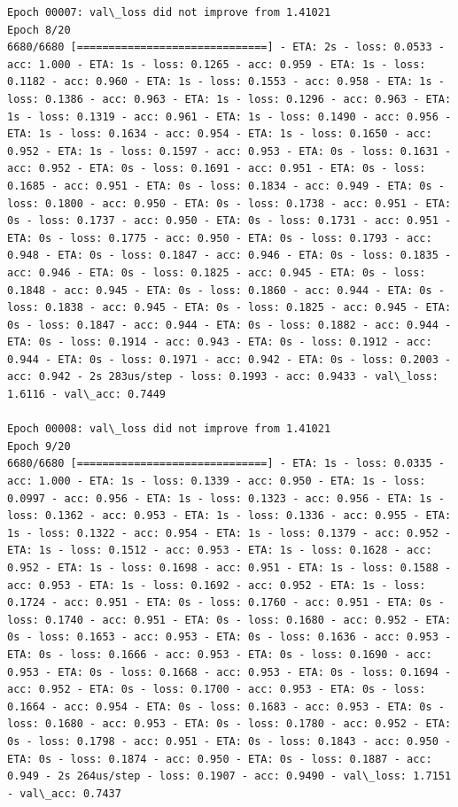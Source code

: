 \documentclass[11pt]{article}
\begin{document}
\begin{Verbatim}[commandchars=\\\{\}]
Epoch 00007: val\_loss did not improve from 1.41021
Epoch 8/20
6680/6680 [==============================] - ETA: 2s - loss: 0.0533 - acc: 1.000 - ETA: 1s - loss: 0.1265 - acc: 0.959 - ETA: 1s - loss: 0.1182 - acc: 0.960 - ETA: 1s - loss: 0.1553 - acc: 0.958 - ETA: 1s - loss: 0.1386 - acc: 0.963 - ETA: 1s - loss: 0.1296 - acc: 0.963 - ETA: 1s - loss: 0.1319 - acc: 0.961 - ETA: 1s - loss: 0.1490 - acc: 0.956 - ETA: 1s - loss: 0.1634 - acc: 0.954 - ETA: 1s - loss: 0.1650 - acc: 0.952 - ETA: 1s - loss: 0.1597 - acc: 0.953 - ETA: 0s - loss: 0.1631 - acc: 0.952 - ETA: 0s - loss: 0.1691 - acc: 0.951 - ETA: 0s - loss: 0.1685 - acc: 0.951 - ETA: 0s - loss: 0.1834 - acc: 0.949 - ETA: 0s - loss: 0.1800 - acc: 0.950 - ETA: 0s - loss: 0.1738 - acc: 0.951 - ETA: 0s - loss: 0.1737 - acc: 0.950 - ETA: 0s - loss: 0.1731 - acc: 0.951 - ETA: 0s - loss: 0.1775 - acc: 0.950 - ETA: 0s - loss: 0.1793 - acc: 0.948 - ETA: 0s - loss: 0.1847 - acc: 0.946 - ETA: 0s - loss: 0.1835 - acc: 0.946 - ETA: 0s - loss: 0.1825 - acc: 0.945 - ETA: 0s - loss: 0.1848 - acc: 0.945 - ETA: 0s - loss: 0.1860 - acc: 0.944 - ETA: 0s - loss: 0.1838 - acc: 0.945 - ETA: 0s - loss: 0.1825 - acc: 0.945 - ETA: 0s - loss: 0.1847 - acc: 0.944 - ETA: 0s - loss: 0.1882 - acc: 0.944 - ETA: 0s - loss: 0.1914 - acc: 0.943 - ETA: 0s - loss: 0.1912 - acc: 0.944 - ETA: 0s - loss: 0.1971 - acc: 0.942 - ETA: 0s - loss: 0.2003 - acc: 0.942 - 2s 283us/step - loss: 0.1993 - acc: 0.9433 - val\_loss: 1.6116 - val\_acc: 0.7449

Epoch 00008: val\_loss did not improve from 1.41021
Epoch 9/20
6680/6680 [==============================] - ETA: 1s - loss: 0.0335 - acc: 1.000 - ETA: 1s - loss: 0.1339 - acc: 0.950 - ETA: 1s - loss: 0.0997 - acc: 0.956 - ETA: 1s - loss: 0.1323 - acc: 0.956 - ETA: 1s - loss: 0.1362 - acc: 0.953 - ETA: 1s - loss: 0.1336 - acc: 0.955 - ETA: 1s - loss: 0.1322 - acc: 0.954 - ETA: 1s - loss: 0.1379 - acc: 0.952 - ETA: 1s - loss: 0.1512 - acc: 0.953 - ETA: 1s - loss: 0.1628 - acc: 0.952 - ETA: 1s - loss: 0.1698 - acc: 0.951 - ETA: 1s - loss: 0.1588 - acc: 0.953 - ETA: 1s - loss: 0.1692 - acc: 0.952 - ETA: 1s - loss: 0.1724 - acc: 0.951 - ETA: 0s - loss: 0.1760 - acc: 0.951 - ETA: 0s - loss: 0.1740 - acc: 0.951 - ETA: 0s - loss: 0.1680 - acc: 0.952 - ETA: 0s - loss: 0.1653 - acc: 0.953 - ETA: 0s - loss: 0.1636 - acc: 0.953 - ETA: 0s - loss: 0.1666 - acc: 0.953 - ETA: 0s - loss: 0.1690 - acc: 0.953 - ETA: 0s - loss: 0.1668 - acc: 0.953 - ETA: 0s - loss: 0.1694 - acc: 0.952 - ETA: 0s - loss: 0.1700 - acc: 0.953 - ETA: 0s - loss: 0.1664 - acc: 0.954 - ETA: 0s - loss: 0.1683 - acc: 0.953 - ETA: 0s - loss: 0.1680 - acc: 0.953 - ETA: 0s - loss: 0.1780 - acc: 0.952 - ETA: 0s - loss: 0.1798 - acc: 0.951 - ETA: 0s - loss: 0.1843 - acc: 0.950 - ETA: 0s - loss: 0.1874 - acc: 0.950 - ETA: 0s - loss: 0.1887 - acc: 0.949 - 2s 264us/step - loss: 0.1907 - acc: 0.9490 - val\_loss: 1.7151 - val\_acc: 0.7437


\end{Verbatim}
\end{document}

